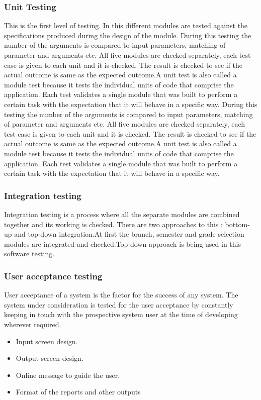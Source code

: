 \documentclass[BTech]{srmuthesis}
\begin{document}
\subsubsection{Unit Testing}
This is the first level of testing. In this different modules are tested against the specifications produced during the design of the module. During this testing the number of the arguments is compared to input parameters, matching of parameter and arguments etc. All five modules are checked separately, each test case is given to each unit and it is checked. The result is checked to see if the actual outcome is same as the expected outcome.A unit test is also called a module test because it tests the individual units of code that comprise the application. Each test validates a single module that was built to perform a certain task with the expectation that it will behave in a specific way. During this testing the number of the arguments is compared to input parameters, matching of parameter and arguments etc. All five modules are checked separately, each test case is given to each unit and it is checked. The result is checked to see if the actual outcome is same as the expected outcome.A unit test is also called a module test because it tests the individual units of code that comprise the application. Each test validates a single module that was built to perform a certain task with the expectation that it will behave in a specific way.
\subsubsection{Integration testing}
Integration testing is a process where all the separate modules are combined together
and its working is checked. There are two approaches to this : bottom-up and top-down
integration.At first the branch, semester and grade selection modules are integrated and checked.Top-down approach is being used in this software testing.
\subsubsection{User acceptance testing}
User acceptance of a system is the factor for the success of any system. The system
under consideration is tested for the user acceptance by constantly keeping in touch
with the prospective system user at the time of developing wherever required.
\begin{itemize}
\item Input screen design.
\item Output screen design.
\item Online message to guide the user.
\item Format of the reports and other outputs
\end{itemize}
\end{document}
